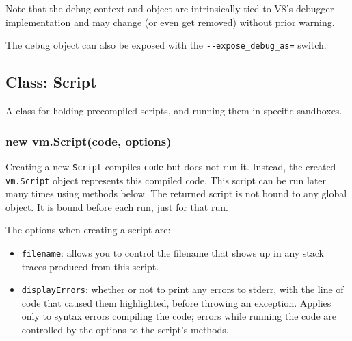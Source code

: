 \begin{Shaded}
\begin{Highlighting}[]
 \NormalTok{(}\NormalTok{);}
\NormalTok{(}\NormalTok{(}\NormalTok{); \});}
\end{Highlighting}
\end{Shaded}

Note that the debug context and object are intrinsically tied to V8's
debugger implementation and may change (or even get removed) without
prior warning.

The debug object can also be exposed with the
\texttt{-\/-expose\_debug\_as=} switch.

\subsection{Class: Script}\label{class-script}

A class for holding precompiled scripts, and running them in specific
sandboxes.

\subsubsection{new vm.Script(code,
options)}\label{new-vm.scriptcode-options}

Creating a new \texttt{Script} compiles \texttt{code} but does not run
it. Instead, the created \texttt{vm.Script} object represents this
compiled code. This script can be run later many times using methods
below. The returned script is not bound to any global object. It is
bound before each run, just for that run.

The options when creating a script are:

\begin{itemize}
\itemsep1pt\parskip0pt
\item
  \texttt{filename}: allows you to control the filename that shows up in
  any stack traces produced from this script.
\item
  \texttt{displayErrors}: whether or not to print any errors to stderr,
  with the line of code that caused them highlighted, before throwing an
  exception. Applies only to syntax errors compiling the code; errors
  while running the code are controlled by the options to the script's
  methods.
\end{itemize}

